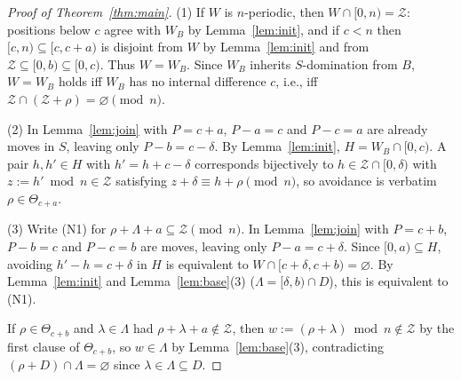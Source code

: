 \documentclass[11pt]{article}
\theoremstyle{remark}
\begin{document}
\begin{proof}[Proof of Theorem~\ref{thm:main}]
(1) If $W$ is $n$-periodic, then $W \cap [0, n) = \mathcal{Z}$: positions below $c$ agree with $W_B$ by Lemma~\ref{lem:init}, and if $c < n$ then $[c, n) \subseteq [c, c+a)$ is disjoint from $W$ by Lemma~\ref{lem:init} and from $\mathcal{Z} \subseteq [0, b) \subseteq [0, c)$. Thus $W = W_B$. Since $W_B$ inherits $S$-domination from $B$, $W = W_B$ holds iff $W_B$ has no internal difference $c$, i.e., iff $\mathcal{Z} \cap (\mathcal{Z} + \rho) = \varnothing \pmod{n}$.

(2) In Lemma~\ref{lem:join} with $P = c + a$, $P - a = c$ and $P - c = a$ are already moves in $S$, leaving only $P - b = c - \delta$. By Lemma~\ref{lem:init}, $H = W_B \cap [0, c)$. A pair $h, h' \in H$ with $h' = h + c - \delta$ corresponds bijectively to $h \in \mathcal{Z} \cap [0, \delta)$ with $z := h' \bmod n \in \mathcal{Z}$ satisfying $z + \delta \equiv h + \rho \pmod{n}$, so avoidance is verbatim $\rho \in \Theta_{c+a}$.

(3) Write \textup{(N1)} for $\rho + \Lambda + a \subseteq \mathcal{Z} \pmod{n}$. In Lemma~\ref{lem:join} with $P = c + b$, $P - b = c$ and $P - c = b$ are moves, leaving only $P - a = c + \delta$. Since $[0, a) \subseteq H$, avoiding $h' - h = c + \delta$ in $H$ is equivalent to $W \cap [c + \delta, c + b) = \varnothing$. By Lemma~\ref{lem:init} and Lemma~\ref{lem:base}(3) ($\Lambda = [\delta, b) \cap D$), this is equivalent to \textup{(N1)}.

If $\rho \in \Theta_{c+b}$ and $\lambda \in \Lambda$ had $\rho + \lambda + a \notin \mathcal{Z}$, then $w := (\rho + \lambda) \bmod n \notin \mathcal{Z}$ by the first clause of $\Theta_{c+b}$, so $w \in \Lambda$ by Lemma~\ref{lem:base}(3), contradicting $(\rho + D) \cap \Lambda = \varnothing$ since $\lambda \in \Lambda \subseteq D$.


\end{proof}
\end{document}
